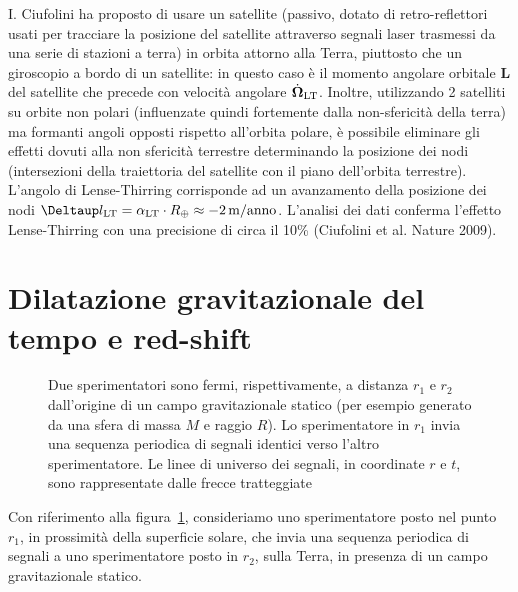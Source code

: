 I. Ciufolini ha proposto di usare un satellite (passivo, dotato di
retro-reflettori usati per tracciare la posizione del satellite attraverso
segnali laser trasmessi da una serie di stazioni a terra) in orbita attorno alla
Terra, piuttosto che un giroscopio a bordo di un satellite: in questo caso è il
momento angolare orbitale $\bm{L}$ del satellite che precede con velocità
angolare $\dot{\bm{\Omega}}_{\textup{LT}}$.  Inoltre, utilizzando 2 satelliti su
orbite non polari (influenzate quindi fortemente dalla non-sfericità della
terra) ma formanti angoli opposti rispetto all'orbita polare, è possibile
eliminare gli effetti dovuti alla non sfericità terrestre determinando la
posizione dei nodi (intersezioni della traiettoria del satellite con il piano
dell'orbita terrestre).  L'angolo di Lense-Thirring corrisponde ad un
avanzamento della posizione dei nodi $\var l_{\textup{LT}} =
\alpha_{\textup{LT}} \cdot R_{\oplus} \approx -\SI{2}{\metre/anno}$.  L'analisi
dei dati conferma l'effetto Lense-Thirring con una precisione di circa il 10\%
(Ciufolini et al. Nature 2009).

\section{Dilatazione gravitazionale del tempo e red-shift}
\label{sec:red-shift-gravitazionale}

\begin{figure}
  \centering
  \caption[Dilatazione gravitazionale dei tempi e redshift]{Due sperimentatori
    sono fermi, rispettivamente, a distanza $r_{1}$ e $r_{2}$ dall'origine di un
    campo gravitazionale statico (per esempio generato da una sfera di massa $M$
    e raggio $R$).  Lo sperimentatore in $r_{1}$ invia una sequenza periodica di
    segnali identici verso l'altro sperimentatore.  Le linee di universo dei
    segnali, in coordinate $r$ e $t$, sono rappresentate dalle frecce
    tratteggiate}
  \label{fig:redshift}
\end{figure}
Con riferimento alla figura~\ref{fig:redshift}, consideriamo uno sperimentatore
posto nel punto $r_{1}$, in prossimità della superficie solare, che invia una
sequenza periodica di segnali a uno sperimentatore posto in $r_{2}$, sulla
Terra, in presenza di un campo gravitazionale statico.


